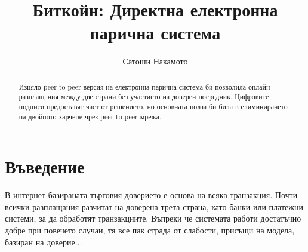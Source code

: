 \documentclass[11pt,a4paper]{article}
\title{\textbf{Биткойн: Директна електронна парична система}}
\author{Сатоши Накамото}
\date{}
\begin{document}
\maketitle

\begin{abstract}
Изцяло peer-to-peer версия на електронна парична система би позволила онлайн разплащания между две страни без участието на доверен посредник. Цифровите подписи предоставят част от решението, но основната полза би била в елиминирането на двойното харчене чрез peer-to-peer мрежа.
\end{abstract}

\section{Въведение}

В интернет-базираната търговия доверието е основа на всяка транзакция. Почти всички разплащания разчитат на доверена трета страна, като банки или платежни системи, за да обработят транзакциите. Въпреки че системата работи достатъчно добре при повечето случаи, тя все пак страда от слабости, присъщи на модела, базиран на доверие...

\end{document}
